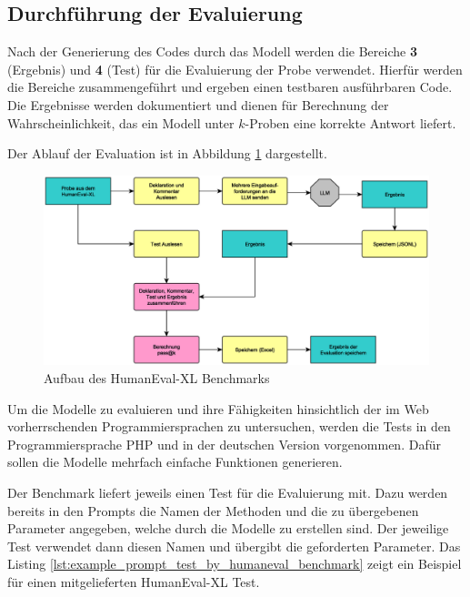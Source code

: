 \subsection{Durchführung der Evaluierung}
Nach der Generierung des Codes durch das Modell werden die Bereiche \textbf{3} (Ergebnis) und \textbf{4} (Test) für die Evaluierung der Probe verwendet. Hierfür werden die Bereiche zusammengeführt und ergeben einen testbaren ausführbaren Code. Die Ergebnisse werden dokumentiert und dienen für Berechnung der Wahrscheinlichkeit, das ein Modell unter $k$-Proben eine korrekte Antwort liefert.\vspace{0.2cm}

Der Ablauf der Evaluation ist in Abbildung \ref{img:sequence_of_evaluation} dargestellt.\vspace{0.2cm}

\begin{figure}[!ht]
	\includegraphics[width=\textwidth]{content/chapter_concept_design/images/ablauf_evaluation.eps}
	\centering
	\caption{Aufbau des HumanEval-XL Benchmarks}
	\label{img:sequence_of_evaluation}
\end{figure}


Um die Modelle zu evaluieren und ihre Fähigkeiten hinsichtlich der im Web vorherrschenden Programmiersprachen zu untersuchen, werden die Tests in den Programmiersprache PHP und in der deutschen Version vorgenommen. Dafür sollen die Modelle mehrfach einfache Funktionen generieren.\vspace{0.2cm}

Der Benchmark liefert jeweils einen Test für die Evaluierung mit. Dazu werden bereits in den Prompts die Namen der Methoden und die zu übergebenen Parameter angegeben, welche durch die Modelle zu erstellen sind. Der jeweilige Test verwendet dann diesen Namen und übergibt die geforderten Parameter. Das Listing \ref{lst:example_prompt_test_by_humaneval_benchmark} zeigt ein Beispiel für einen mitgelieferten HumanEval-XL Test.\vspace{0.2cm}

